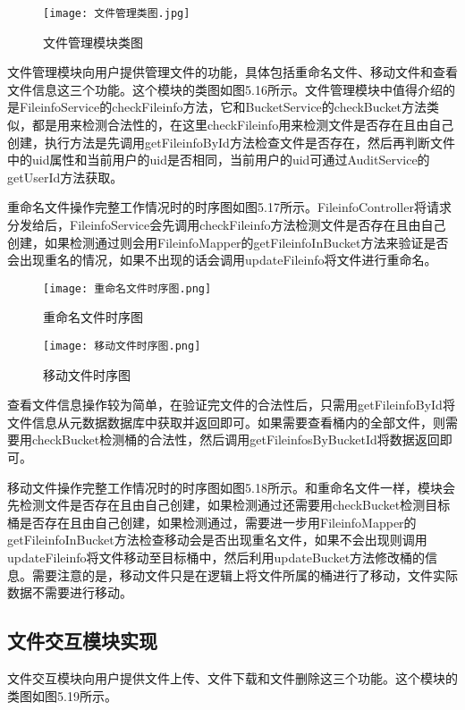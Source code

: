 \begin{figure}
  \centering
  \texttt{[image: 文件管理类图.jpg]}
  \caption{文件管理模块类图}
\end{figure}

文件管理模块向用户提供管理文件的功能，具体包括重命名文件、移动文件和查看文件信息这三个功能。这个模块的类图如图5.16所示。文件管理模块中值得介绍的是FileinfoService的checkFileinfo方法，它和BucketService的checkBucket方法类似，都是用来检测合法性的，在这里checkFileinfo用来检测文件是否存在且由自己创建，执行方法是先调用getFileinfoById方法检查文件是否存在，然后再判断文件中的uid属性和当前用户的uid是否相同，当前用户的uid可通过AuditService的getUserId方法获取。

重命名文件操作完整工作情况时的时序图如图5.17所示。FileinfoController将请求分发给后，FileinfoService会先调用checkFileinfo方法检测文件是否存在且由自己创建，如果检测通过则会用FileinfoMapper的getFileinfoInBucket方法来验证是否会出现重名的情况，如果不出现的话会调用updateFileinfo将文件进行重命名。

\begin{figure}
  \centering
  \texttt{[image: 重命名文件时序图.png]}
  \caption{重命名文件时序图}
\end{figure}

\begin{figure}
  \centering
  \texttt{[image: 移动文件时序图.png]}
  \caption{移动文件时序图}
\end{figure}

查看文件信息操作较为简单，在验证完文件的合法性后，只需用getFileinfoById将文件信息从元数据数据库中获取并返回即可。如果需要查看桶内的全部文件，则需要用checkBucket检测桶的合法性，然后调用getFileinfosByBucketId将数据返回即可。

移动文件操作完整工作情况时的时序图如图5.18所示。和重命名文件一样，模块会先检测文件是否存在且由自己创建，如果检测通过还需要用checkBucket检测目标桶是否存在且由自己创建，如果检测通过，需要进一步用FileinfoMapper的getFileinfoInBucket方法检查移动会是否出现重名文件，如果不会出现则调用updateFileinfo将文件移动至目标桶中，然后利用updateBucket方法修改桶的信息。需要注意的是，移动文件只是在逻辑上将文件所属的桶进行了移动，文件实际数据不需要进行移动。

\subsection{文件交互模块实现}
文件交互模块向用户提供文件上传、文件下载和文件删除这三个功能。这个模块的类图如图5.19所示。

